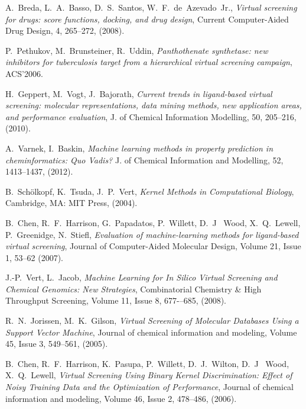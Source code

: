 \documentclass[a4paper,10pt]{report}
\begin{document}
  \begin{thebibliography}{99}
      A.~Breda, L.~A.~Basso, D.~S.~Santos, W.~F.~de~Azevado~Jr., 
      \textit{Virtual screening for drugs: score functions, docking, and drug design},
      Current Computer-Aided Drug Design, 4, 265--272,
      (2008).
      
      P.~Pethukov, M.~Brunsteiner, R.~Uddin,
      \textit{Panthothenate synthetase: new inhibitors for tuberculosis target from a hierarchical virtual screening campaign},
      ACS'2006.

      H.~Geppert, M.~Vogt, J.~Bajorath,
      \textit{Current trends in ligand-based virtual screening: molecular representations, data mining methods, new application areas, and performance evaluation},
      J. of Chemical Information Modelling, 50, 205--216,
      (2010).
      
      A.~Varnek, I.~Baskin,
      \textit{Machine learning methods in property prediction in cheminformatics: Quo Vadis?}
      J. of Chemical Information and Modelling, 52, 1413--1437,
      (2012).
      
     B.~Sch{\"o}lkopf, K.~Tsuda, J.~P.~Vert,
     \textit{Kernel Methods in Computational Biology},
     Cambridge, MA: MIT Press,
     (2004).
      
     B.~Chen, R.~F.~Harrison, G.~Papadatos, P.~Willett, D.~J~ Wood, X.~Q.~Lewell, P.~Greenidge, N.~Stiefl,
     \textit{Evaluation of machine-learning methods for ligand-based virtual screening},
     Journal of Computer-Aided Molecular Design, Volume 21, Issue 1, 53--62
     (2007).
     
     J.-P.~Vert, L.~Jacob,
     \textit{Machine Learning for In Silico Virtual Screening and Chemical Genomics: New Strategies},
     Combinatorial Chemistry \& High Throughput Screening, Volume 11, Issue 8, 677-–685,
     (2008).
     
     R.~N.~Jorissen, M.~K.~Gilson,
     \textit{Virtual Screening of Molecular Databases Using a Support Vector Machine},
     Journal of chemical information and modeling, Volume 45, Issue 3, 549--561,
     (2005).
     
     B.~Chen, R.~F.~Harrison, K.~Pasupa, P.~Willett, D.~J.~Wilton, D.~J~ Wood, X.~Q.~Lewell,
     \textit{Virtual Screening Using Binary Kernel Discrimination: Effect of Noisy Training Data and the Optimization of Performance},
     Journal of chemical information and modeling, Volume 46, Issue 2, 478--486,
     (2006).
     

\end{thebibliography}
\end{document}
